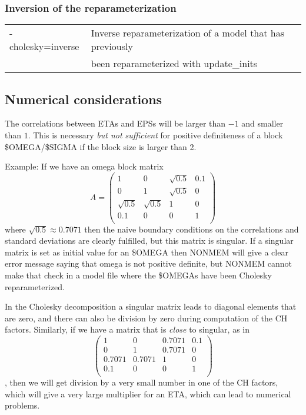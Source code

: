 \subsubsection*{Inversion of the reparameterization}
\begin{tabular}{ll}
    -cholesky=inverse &             Inverse reparameterization of a model that has previously\\
     &  been reparameterized with update\_inits\\
\end{tabular}

\subsection{Numerical considerations}
The correlations between ETAs and EPSs
will be larger than $-1$ and smaller than $1$. This is necessary \emph{but not sufficient}
for positive definiteness of a block \$OMEGA/\$SIGMA if the block size is larger than 2.

Example: If we have an omega block matrix
\[
A=
\left(
\begin{array}{cccc}
1          & 0          & \sqrt{0.5} & 0.1\\
0          & 1          & \sqrt{0.5} & 0\\
\sqrt{0.5} & \sqrt{0.5} & 1          & 0\\
0.1        & 0          & 0          & 1\\
\end{array}
\right)
\]
where $\sqrt{0.5}\approx 0.7071$
then the naive boundary conditions on the correlations and standard deviations are clearly fulfilled, but this
matrix is singular.
If a singular matrix is set as initial value for an \$OMEGA then NONMEM will
give a clear error message saying that omega is not positive definite, but NONMEM cannot make that check
in a model file where the \$OMEGAs have been Cholesky reparameterized.

In the Cholesky decomposition
a singular matrix leads to diagonal elements that are zero,
and there can also be division by zero during computation of the CH factors.
Similarly, if we have a matrix that is \emph{close} to singular, as in
\[
\left(
\begin{array}{cccc}
1          & 0          & 0.7071     & 0.1\\
0          & 1          & 0.7071     & 0\\
0.7071     & 0.7071     & 1          & 0\\
0.1        & 0          & 0          & 1\\
\end{array}
\right)
\]
,
then we will get division by a very small number in one of the CH factors,
which will give a very large multiplier for an ETA, which can lead to numerical problems.



